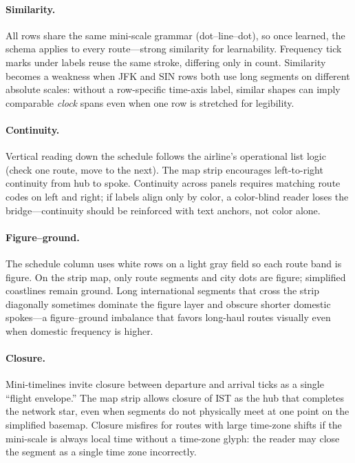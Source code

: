 \documentclass[11pt]{article}
\begin{document}
\paragraph{Similarity.}
All rows share the same mini-scale grammar (dot--line--dot), so once learned, the schema applies to every route---strong similarity for learnability. Frequency tick marks under labels reuse the same stroke, differing only in count. Similarity becomes a weakness when JFK and SIN rows both use long segments on different absolute scales: without a row-specific time-axis label, similar shapes can imply comparable \emph{clock} spans even when one row is stretched for legibility.

\paragraph{Continuity.}
Vertical reading down the schedule follows the airline's operational list logic (check one route, move to the next). The map strip encourages left-to-right continuity from hub to spoke. Continuity across panels requires matching route codes on left and right; if labels align only by color, a color-blind reader loses the bridge---continuity should be reinforced with text anchors, not color alone.

\paragraph{Figure--ground.}
The schedule column uses white rows on a light gray field so each route band is figure. On the strip map, only route segments and city dots are figure; simplified coastlines remain ground. Long international segments that cross the strip diagonally sometimes dominate the figure layer and obscure shorter domestic spokes---a figure--ground imbalance that favors long-haul routes visually even when domestic frequency is higher.

\paragraph{Closure.}
Mini-timelines invite closure between departure and arrival ticks as a single ``flight envelope.'' The map strip allows closure of IST as the hub that completes the network star, even when segments do not physically meet at one point on the simplified basemap. Closure misfires for routes with large time-zone shifts if the mini-scale is always local time without a time-zone glyph: the reader may close the segment as a single time zone incorrectly.
\end{document}
